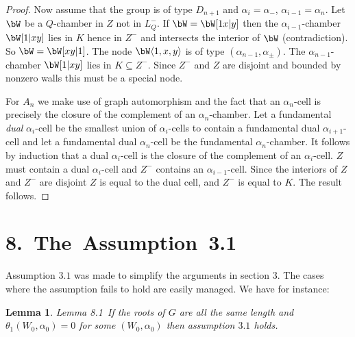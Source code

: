 \documentclass{memo-l}
\newtheorem{lemma}[theorem]{Lemma}
\theoremstyle{definition}
\theoremstyle{remark}
\numberwithin{section}{chapter}
\numberwithin{equation}{chapter}
\begin{document}
\begin{proof}


   Now assume that the group is of type $D_{n+1}$ and
${\alpha_i} = {\alpha}_{-}$, $\alpha_{i-1}=\alpha_n$. 
Let $\bW$ be a $Q$-chamber in 
$Z$ not in
$L_{Q}^{-}$.  If $\bW = \bW [1x\vert y]$ 
then the ${\alpha_{i-1}}$-chamber
$\bW[1\vert xy]$ lies in $K$ hence in $Z^{-}$ and 
intersects the interior of $\bW$ (contradiction).  
So $\bW = \bW [xy\vert 1]$.
The node $\bW\langle 1,x,y\rangle $ is of type 
$({\alpha}_{n-1},{\alpha}_{\pm})$.
The ${\alpha}_{n-1}$-chamber $\bW[1\vert xy]$ lies in
$K \subseteq Z^{-}$.  Since $Z^{-}$ and $Z$ are disjoint and bounded by
nonzero walls this must be a special node.

	              \medskip
		      \medskip

For $A_{n}$ we make
use of graph automorphism and the fact that an ${\alpha}_{n}$-cell is
precisely the closure of the complement of an ${\alpha}_{n}$-chamber.  Let
a fundamental {\it dual} ${\alpha}_{i}$-cell be the smallest union of
${\alpha}_{i}$-cells to contain a fundamental dual ${\alpha}_{i+1}$-cell
and let a fundamental dual ${\alpha}_{n}$-cell be the fundamental
${\alpha}_{n}$-chamber.  It follows by induction that a dual
${\alpha}_{i}$-cell is the closure of the complement of an
${\alpha}_{i}$-cell.  $Z$ must contain a dual ${\alpha}_{i}$-cell and
$Z^{-}$ contains an ${\alpha}_{i-1}$-cell.  Since the interiors of $Z$ and
$Z^{-}$ are disjoint $Z$ is equal to the dual cell, and $Z^{-}$ is equal to
$K$.  The result follows.
\end{proof} 

\section{8.\  The\ Assumption\ 3.1}

   Assumption $3.1$ was made to simplify the arguments in section $3$.  The
cases where the assumption fails to hold are easily managed.  We have for
instance:



\begin{lemma}{Lemma 8.1}\ If the roots of $G$ are all the same length and
${\theta}_{1}(W_{0},{\alpha}_{0})=0$ for some $(W_{0},{\alpha}_{0})$ then
assumption $3.1$ holds.
\end{lemma}
\end{document}
